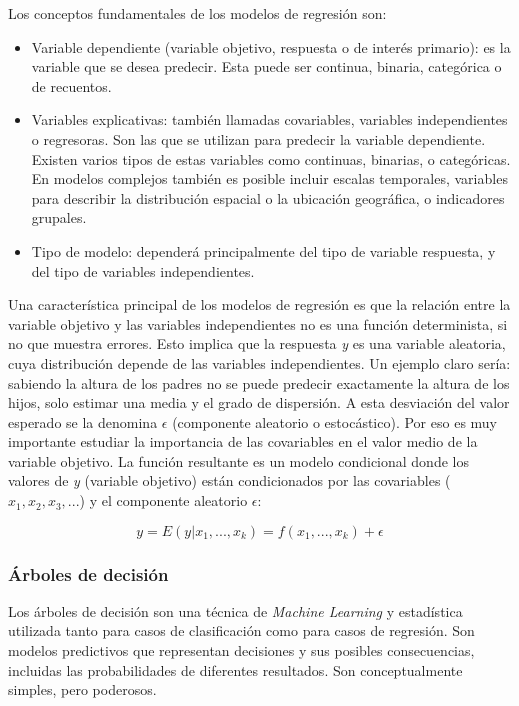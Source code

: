 \documentclass[12pt,a4paper]{article}
\begin{document}
Los conceptos fundamentales de los modelos de regresión son:
\begin{itemize}
	\item Variable dependiente (variable objetivo, respuesta o de interés primario): es la variable que se desea predecir. Esta puede ser continua, binaria, categórica o de recuentos.
	\item Variables explicativas: también llamadas covariables, variables independientes o regresoras. Son las que se utilizan para predecir la variable dependiente. Existen varios tipos de estas variables como continuas, binarias, o categóricas. En modelos complejos también es posible incluir escalas temporales, variables para describir la distribución espacial o la ubicación geográfica, o indicadores grupales.
	\item Tipo de modelo: dependerá principalmente del tipo de variable respuesta, y del tipo de variables independientes.
\end{itemize}

Una característica principal de los modelos de regresión es que la relación entre la variable objetivo y las variables independientes no es una función determinista, si no que muestra errores. Esto implica que la respuesta \textit{y} es una variable aleatoria, cuya distribución depende de las variables independientes. Un ejemplo claro sería: sabiendo la altura de los padres no se puede predecir exactamente la altura de los hijos, solo estimar una media y el grado de dispersión. A esta desviación del valor esperado se la denomina $\epsilon$ (componente aleatorio o estocástico). Por eso es muy importante estudiar la importancia de las covariables en el valor medio de la variable objetivo. La función resultante es un modelo condicional donde los valores de \textit{y} (variable objetivo) están condicionados por las covariables ($x_1, x_2, x_3, ...$) y el componente aleatorio $\epsilon$:

\begin{equation}
	y = E(y|x_1, ..., x_k) = f(x_1, ..., x_k) + \epsilon 
\end{equation}


\subsubsection{Árboles de decisión}\label{decision_tree}
Los árboles de decisión son una técnica de \textit{Machine Learning} y estadística utilizada tanto para casos de clasificación como para casos de regresión. Son modelos predictivos que representan decisiones y sus posibles consecuencias, incluidas las probabilidades de diferentes resultados. Son conceptualmente simples, pero poderosos.
\end{document}
